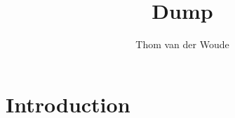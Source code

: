 \documentclass[english]{article}
\begin{document}
	
	\title{Dump}
	
	\author{Thom van der Woude}
	\date{}
	
	\maketitle

	\section{Introduction}
					
			
			
			
			
			
			
			
			
			
			
			
			
			
			
\end{document}
